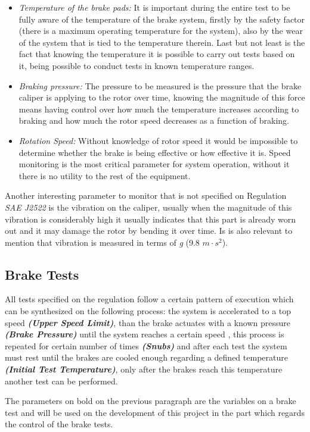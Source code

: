 			\begin{itemize}
				\item \textit{Temperature of the brake pads:} It is important during the entire test to be fully aware of the temperature of the brake system, firstly by the safety factor (there is a maximum operating temperature for the system), also by the wear of the system that is tied to the temperature therein. Last but not least is the fact that knowing the temperature it is possible to carry out tests based on it, being possible to conduct tests in known temperature ranges.\label{itm:monitored-temperature}
				\item \textit{Braking pressure:} The pressure to be measured is the pressure that the brake caliper is applying to the rotor over time, knowing the magnitude of this force means having control over how much the temperature increases according to braking and how much the rotor speed decreases as a function of braking.\label{itm:monitored-pressure}
				\item \textit{Rotation Speed:} Without knowledge of rotor speed it would be impossible to determine whether the brake is being effective or how effective it is. Speed monitoring is the most critical parameter for system operation, without it there is no utility to the rest of the equipment. \label{itm:monitored-speed}
			\end{itemize}

			Another interesting parameter to monitor that is not specified on Regulation \textit{SAE J2522} is the vibration on the caliper, usually when the magnitude of this vibration is considerably high it usually indicates that this part is already worn out \cite{goodyear-calipers} and it may damage the rotor by bending it over time. Is is also relevant to mention that vibration is measured in terms of \textit{g} (9.8 $m\cdot s^2$).

		\subsection{Brake Tests}\label{ssec:brake-tests}
			All tests specified on the regulation follow a certain pattern of execution which can be synthesized on the following process: the system is accelerated to a top speed \textit{\textbf{(Upper Speed Limit)}}, than the brake actuates with a known pressure \textit{\textbf{(Brake Pressure)}} until the system reaches a certain speed , this process is repeated for certain number of times \textit{\textbf{(Snubs)}} and after each test the system must rest until the brakes are cooled enough regarding a defined temperature \textit{\textbf{(Initial Test Temperature)}}, only after the brakes reach this temperature another test can be performed.
			\par
			The parameters on bold on the previous paragraph are the variables on a brake test and will be used on the development of this project in the part which regards the control of the brake tests.
